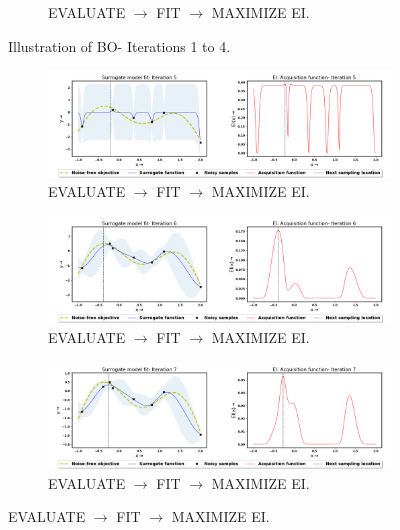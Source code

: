 \begin{figure}[!ht]
\begin{subfigure}{1\textwidth}
  			\caption{EVALUATE $\rightarrow$ FIT $\rightarrow$ MAXIMIZE EI.}
  			\label{fig:BO4}
		\end{subfigure}
\captionsetup{justification=justified}
\caption[Illustration of BO- Iterations 1 to 4.]{Illustration of BO- Iterations 1 to 4.}
\label{fig:BO_steps}
\end{figure}


\begin{figure}[!ht]
		\centering
		\begin{subfigure}{1\textwidth}
  			\centering
  			\includegraphics[width=1\linewidth, height=0.2\textheight]{images/BO5.png}
  			\caption{EVALUATE $\rightarrow$ FIT $\rightarrow$ MAXIMIZE EI.}
  			\label{fig:BO5}
		\end{subfigure}
		\begin{subfigure}{1\textwidth}
  			\centering
  			\includegraphics[width=1\linewidth, height=0.2\textheight]{images/BO6.png}
  			\caption{EVALUATE $\rightarrow$ FIT $\rightarrow$ MAXIMIZE EI.}
  			\label{fig:BO6}
		\end{subfigure}
		\begin{subfigure}{1\textwidth}
  			\centering
  			\includegraphics[width=1\linewidth, height=0.2\textheight]{images/BO7.png}
  			\caption{EVALUATE $\rightarrow$ FIT $\rightarrow$ MAXIMIZE EI.}

\end{subfigure}
\end{figure}
